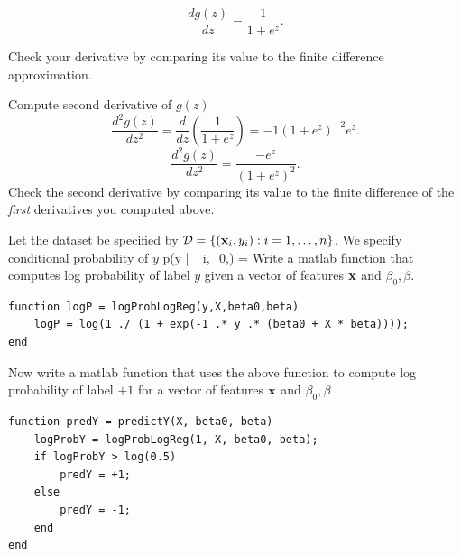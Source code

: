 \documentclass{article}
\begin{document}
\[
\frac{dg(z)}{dz} = \frac{1}{1+e^{z}}.
\]

Check your derivative by comparing its value to the finite difference approximation.

\newproblem{1pt}
Compute second derivative of $g(z)$
\[
\frac{d^{2}g(z)}{dz^{2}} = \frac{d}{dz}(\frac{1}{1+e^{z}}) = -1 (1+e^{z})^{-2} e^{z}.
\]
\[
\frac{d^{2}g(z)}{dz^{2}} = \frac{-e^{z}}{(1+e^{z})^{2}}.
\]
Check the second derivative by comparing its value to the finite difference of the {\em first} derivatives you computed above.


\newproblem{1pt}
Let the dataset be specified by $\mathcal{D} = \left\{ (\mathbf{x}_i,y_i):i=1,\dots,n \right\}$. We specify conditional probability of $y$
\BEQ \label{eq:plr}
p(y | \xx_i,\beta_0,\beta) = 
\EEQ
Write a matlab function that computes log probability of label $y$ given a vector of features $\mathbf{x}$ and $\beta_0,\beta$.
\begin{verbatim}
function logP = logProbLogReg(y,X,beta0,beta)
    logP = log(1 ./ (1 + exp(-1 .* y .* (beta0 + X * beta))));
end
\end{verbatim}

Now write a matlab function that uses the above function to compute log probability of label $+1$ for a vector of features $\mathbf{x}$ and $\beta_0,\beta$
\begin{verbatim}
function predY = predictY(X, beta0, beta)
    logProbY = logProbLogReg(1, X, beta0, beta);
    if logProbY > log(0.5)
        predY = +1;
    else
        predY = -1;
    end
end
\end{verbatim}
\end{document}

